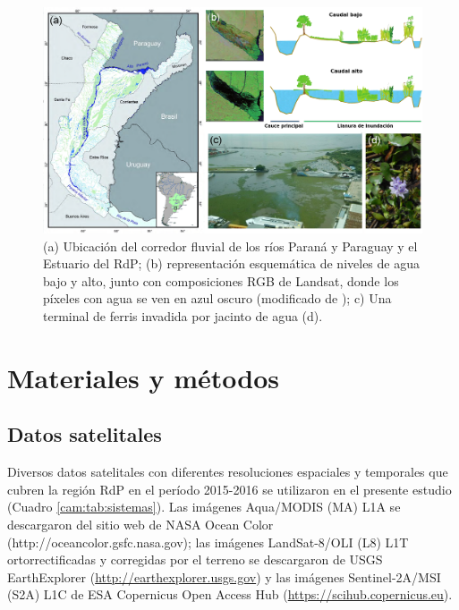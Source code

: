    
    \begin{figure}
    \centering
    \includegraphics[width=\textwidth]{cam/figures/parana.png}
    \caption[Ubicación del corredor fluvial de los ríos Paraná, Paraguay y RdP y representación esquemática de niveles de agua bajo y alto]{(a) Ubicación del corredor fluvial de los ríos Paraná y Paraguay y el Estuario del RdP; (b) representación esquemática de niveles de agua bajo y alto, junto con composiciones RGB de Landsat, donde los píxeles con agua se ven en azul oscuro (modificado de \cite{minotti2013}); c) Una terminal de ferris invadida por jacinto de agua (d).}
    \label{cam:parana}
    \end{figure}

\section{Materiales y métodos}
\label{cam:s:materiales}

    \subsection{Datos satelitales}
    \label{cam:s:datasat}
        
        Diversos datos satelitales con diferentes resoluciones espaciales y temporales que cubren la región RdP en el período 2015-2016 se utilizaron en el presente estudio (Cuadro \ref{cam:tab:sistemas}). Las imágenes Aqua/MODIS (MA) L1A se descargaron del sitio web de NASA Ocean Color (http://oceancolor.gsfc.nasa.gov); las imágenes LandSat-8/OLI (L8) L1T ortorrectificadas y corregidas por el terreno se descargaron de USGS EarthExplorer (\url{http://earthexplorer.usgs.gov}) y las imágenes Sentinel-2A/MSI (S2A) L1C de ESA Copernicus Open Access Hub (\url{https://scihub.copernicus.eu}).

